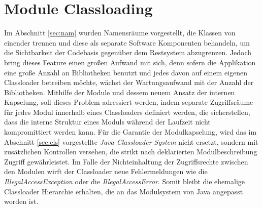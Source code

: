  \section{Module Classloading} \label{sec:mod-cll}
    Im Abschnitt \ref{sec:nam} wurden Namensräume vorgestellt, die Klassen von einender trennen und diese als separate Software Komponenten behandeln, um die Sichtbarkeit der Codebasis gegenüber dem Restsystem abzugrenzen. Jedoch bring dieses Feature einen großen Aufwand mit sich, denn sofern die Applikation eine große Anzahl an Bibliotheken benutzt und jedes davon auf einem eigenen Classloader betreiben möchte, wächst der Wartungsaufwand mit der Anzahl der Bibliotheken.\newline
    Mithilfe der Module und dessem neuem Ansatz der internen Kapselung, soll dieses Problem adressiert werden, indem separate Zugriffsräume für jedes Modul innerhalb eines Classloaders definiert werden, die sicherstellen, dass die interne Struktur eines Moduls während der Laufzeit nicht kompromittiert werden kann.\newline
    Für die Garantie der Modulkapselung, wird das im Abschnitt \ref{sec:cls} vorgestellte \textit{Java Classloader System} nicht ersetzt, sondern mit zusätzlichen Kontrollen versehen, die strikt nach deklarierten Modulbeschreibung Zugriff gewährleistet. Im Falle der Nichteinhaltung der Zugriffsrechte zwischen den Modulen wirft der Classloader neue Fehlermeldungen wie die \textit{IllegalAccessException} oder die \textit{IllegalAccessError}. Somit bleibt die ehemalige Classloader Hierarchie erhalten, die an das Modulsystem von Java angepasst worden ist. \cite{classLoadingOracle, modulMitJava9}\bigbreak

